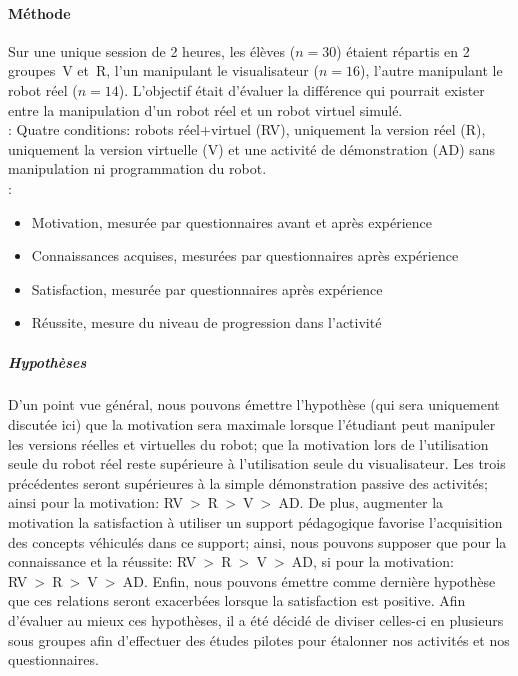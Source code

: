             \paragraph{Méthode}
                Sur une unique session de 2 heures, les élèves ($n=30$) étaient répartis en 2 groupes~V et~R, l'un manipulant le visualisateur ($n=16$), l'autre manipulant le robot réel ($n=14$). L'objectif était d'évaluer la différence qui pourrait exister entre la manipulation d'un robot réel et un robot virtuel simulé.\\
                : 
                Quatre conditions: \Li robots réel+virtuel (RV), \ii uniquement la version réel (R), \iii uniquement la version virtuelle (V) et \iiii une activité de démonstration (AD) sans manipulation ni programmation du robot.\\
                : 
                \begin{itemize}\myItemStyle
                    \item Motivation, mesurée par questionnaires avant et après expérience
                    \item Connaissances acquises, mesurées par questionnaires après expérience
                    \item Satisfaction, mesurée par questionnaires après expérience
                    \item Réussite, mesure du niveau de progression dans l'activité
                \end{itemize}{}
                \subparagraph{Hypothèses}
                    D'un point vue général, nous pouvons émettre l'hypothèse (qui sera uniquement discutée ici) que la motivation sera maximale lorsque l'étudiant peut manipuler les versions réelles et virtuelles du robot; que la motivation lors de l'utilisation seule du robot réel reste supérieure à l'utilisation seule du visualisateur. Les trois précédentes seront supérieures à la simple démonstration passive des activités; ainsi pour la motivation: RV~>~R~>~V~>~AD.
                    De plus, augmenter la motivation \etou la satisfaction à utiliser un support pédagogique favorise l'acquisition des concepts véhiculés dans ce support; ainsi, nous pouvons supposer que pour la connaissance et la réussite: RV~>~R~>~V~>~AD, si pour la motivation: RV~>~R~>~V~>~AD. 
                    Enfin, nous pouvons émettre comme dernière hypothèse que ces relations seront exacerbées lorsque la satisfaction est positive.
                    Afin d'évaluer au mieux ces hypothèses, il a été décidé de diviser celles-ci en plusieurs sous groupes afin d'effectuer des études pilotes pour étalonner nos activités et nos questionnaires.
